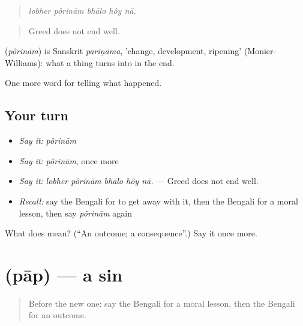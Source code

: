 \begin{quote}
\emph{lobher pôrinām bhālo hôy nā.}
\end{quote}

\begin{quote}
Greed does not end well.
\end{quote}

\begin{cousinweb}
\textbf{} (\emph{pôrinām}) is Sanskrit \emph{pariṇāma}, 'change, development, ripening' (Monier-Williams): what a thing turns into in the end.
\end{cousinweb}

\begin{grammarlens}[title={What you've built}]
One more word for telling what happened.
\end{grammarlens}

\subsection*{Your turn}
\begin{itemize}
\raggedright
  \item \emph{Say it:} \emph{pôrinām}
  \item \emph{Say it:} \emph{pôrinām}, once more
  \item \emph{Say it:} \emph{lobher pôrinām bhālo hôy nā.} — Greed does not end well.
  \item \emph{Recall:} say the Bengali for to get away with it, then the Bengali for a moral lesson, then say \emph{pôrinām} again
\end{itemize}

\begin{tcolorbox}[breakable,colback=teal!4,colframe=teal!35!black,title={Before you move on}]
What does  mean? (\textquotedblleft{}An outcome; a consequence\textquotedblright{}.) Say it once more.
\end{tcolorbox}
\section[\texorpdfstring{\bn{পাপ} (pāp)}{পাপ (pāp)}]{ (pāp) — a sin}

\label{lesson:BN-C325-pap}



\begin{quote}
Before the new one: say the Bengali for a moral lesson, then the Bengali for an outcome.
\end{quote}

